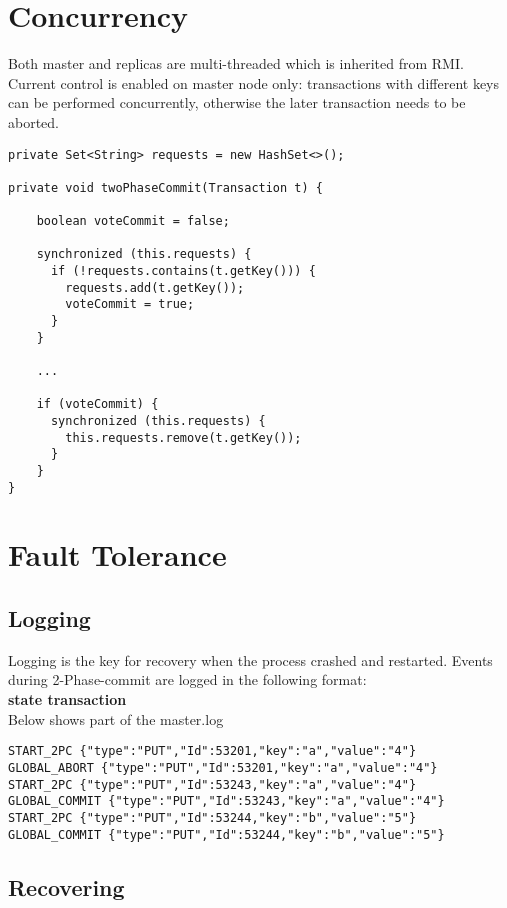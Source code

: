 \documentclass[11pt, oneside]{article}   	%
\begin{document}
\section{Concurrency}
\label{sec:concurrency}
Both master and replicas are multi-threaded which is inherited from RMI. \\
Current control is enabled on master node only: transactions with different keys can be performed concurrently, otherwise the later transaction needs to be aborted.
\begin{verbatim}               
private Set<String> requests = new HashSet<>();

private void twoPhaseCommit(Transaction t) {

    boolean voteCommit = false;

    synchronized (this.requests) {
      if (!requests.contains(t.getKey())) {
        requests.add(t.getKey());
        voteCommit = true;
      }
    }
    
    ...
    
    if (voteCommit) {
      synchronized (this.requests) {
        this.requests.remove(t.getKey());
      }
    }
}
\end{verbatim}

\section{Fault Tolerance}
\subsection{Logging}
Logging is the key for recovery when the process crashed and restarted.
Events during 2-Phase-commit are logged in the following format: \\
{\bf state transaction} \\
Below shows part of the master.log
\begin{verbatim}
START_2PC {"type":"PUT","Id":53201,"key":"a","value":"4"}
GLOBAL_ABORT {"type":"PUT","Id":53201,"key":"a","value":"4"}
START_2PC {"type":"PUT","Id":53243,"key":"a","value":"4"}
GLOBAL_COMMIT {"type":"PUT","Id":53243,"key":"a","value":"4"}
START_2PC {"type":"PUT","Id":53244,"key":"b","value":"5"}
GLOBAL_COMMIT {"type":"PUT","Id":53244,"key":"b","value":"5"}
\end{verbatim}
\subsection{Recovering}
\end{document}

